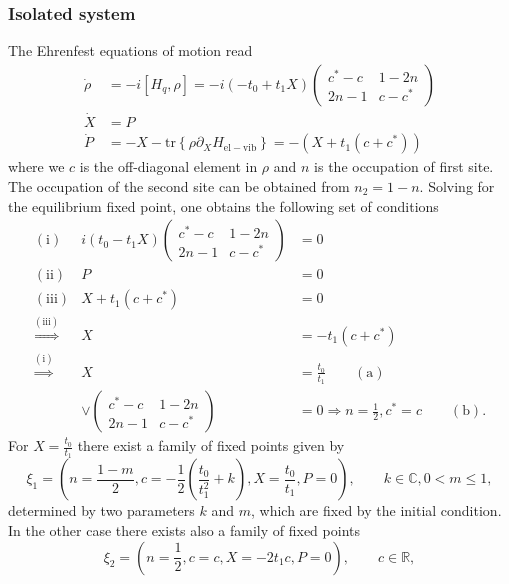 \documentclass{article}
\newcommand{\tr}[1]{\mathrm{tr}\left\{#1\right\}}
\begin{document}
\subsubsection{Isolated system}
The Ehrenfest equations of motion read 
\begin{align}
	\dot{\rho} &= -i[H_q,\rho] = 
	-i(-t_0+t_1X)\begin{pmatrix}
		c^*-c & 1-2n\\
		2n-1 & c-c^*
	\end{pmatrix}
	\label{eq:QEOM_P2}\\
	\dot{X} &= P \label{eq:HEOM_P2_1}\\
	\dot{P} &= -X - \tr{\rho\partial_X H_\mathrm{el-vib}} = -(X+t_1(c+c^*)) \label{eq:HEOM_P2_2}
\end{align}
where we $c$ is the off-diagonal element in $\rho$ and $n$ is the occupation of first site. The occupation of the second site can be obtained from $n_2 = 1-n$.
Solving for the equilibrium fixed point, one obtains the following set of conditions
\begin{eqnarray}
	\mathrm{(i)} &  i(t_0-t_1X) \begin{pmatrix}
		c^*-c & 1-2n\\
		2n-1 & c-c^*
	\end{pmatrix} & = 0\\
	\mathrm{(ii)} & P &= 0\\
	\mathrm{(iii)} & X + t_1(c+c^*) &= 0\\
	\overset{\mathrm{(iii)}}{\Rightarrow} &X&= -t_1(c+c^*)\\ \overset{\mathrm{(i)}}{\Rightarrow} &  X &= \frac{t_0}{t_1} \qquad \mathrm{(a)} \\
	& \vee  \begin{pmatrix}
		c^*-c & 1-2n\\
		2n-1 & c-c^*
	\end{pmatrix} & = 0 \Rightarrow n=\frac{1}{2}, c^*=c \qquad \mathrm{(b)}.
\end{eqnarray}
For $X=\frac{t_0}{t_1}$ there exist a family of fixed points given by
\begin{equation}
	\xi_1 = \left(n=\frac{1-m}{2}, c = -\frac{1}{2}\left(\frac{t_0}{t_1^2}+k\right), X=\frac{t_0}{t_1}, P = 0 \right),\qquad k\in\mathds{C}, 0<m\leq 1,
\end{equation}
determined by two parameters $k$ and $m$, which are fixed by the initial condition.
In the other case there exists also a family of fixed points
\begin{equation}
	\xi_2 = (n = \frac{1}{2}, c=c, X=-2t_1c , P=0), \qquad c\in\mathds{R},
\end{equation}
\end{document}
